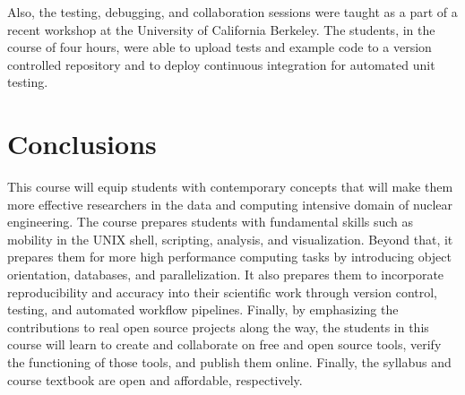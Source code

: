 \documentclass{anstrans}
\begin{document}
Also, the testing, debugging, and collaboration sessions were taught as a part
of a recent workshop at the University of California Berkeley. The students, in
the course of four hours, were able to upload tests and example code to a
version controlled repository and to deploy continuous integration for
automated unit testing.

\section{Conclusions}

This course will equip students with contemporary concepts that will make them more
effective researchers in the data and computing intensive domain of nuclear
engineering. The course prepares students with fundamental skills such
as mobility in the UNIX shell, scripting, analysis, and visualization. Beyond
that, it prepares them for more high performance computing tasks by introducing
object orientation, databases, and parallelization. It also prepares them to
incorporate reproducibility and accuracy into their scientific work through
version control, testing, and automated workflow pipelines.  Finally, by
emphasizing the contributions to real open source projects along the way, the
students in this course will learn to create and collaborate on free and open
source tools, verify the functioning of those tools, and publish them online.
Finally, the syllabus and course textbook are open and affordable,
respectively.


 
\end{document}
